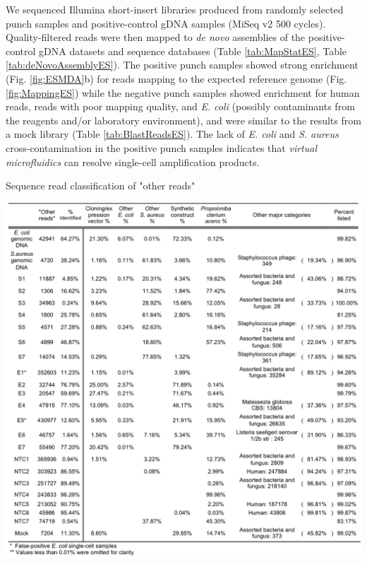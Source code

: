 We sequenced Illumina short-insert libraries produced from randomly selected punch samples and positive-control gDNA samples (MiSeq v2 500 cycles). Quality-filtered reads were then mapped to \textit{de novo} assemblies of the positive-control gDNA datasets and sequence databases (Table \ref{tab:MapStatES}, Table \ref{tab:deNovoAssemblyES}). The positive punch samples showed strong enrichment (Fig. \ref{fig:ESMDA}b) for reads mapping to the expected reference genome (Fig. \ref{fig:MappingES}) while the negative punch samples showed enrichment for human reads, reads with poor mapping quality, and \textit{E. coli} (possibly contaminants from the reagents and\slash or laboratory environment), and were similar to the results from a mock library (Table \ref{tab:BlastReadsES}). The lack of \textit{E. coli}  and \textit{S. aureus} cross-contamination in the positive punch samples indicates that \textit{virtual microfluidics} can resolve single-cell amplification products.

\begin{table}
\caption{Sequence read classification of "other reads"}
\begin{center}
\includegraphics[width=\textwidth]{./figures/OtherReadsClassificationES}
\end{center}
\label{tab:BlastReadsES}
\end{table}

